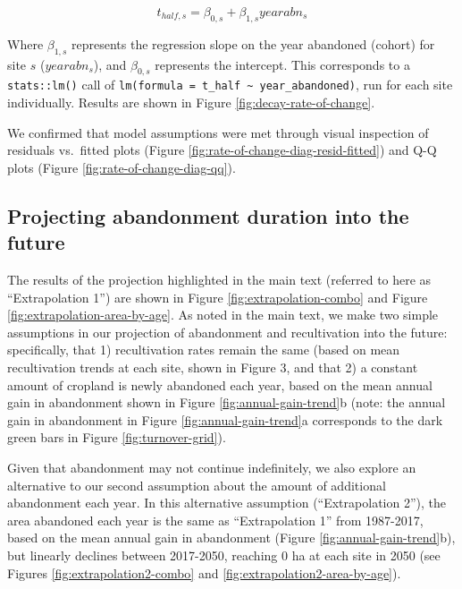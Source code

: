 \documentclass[9pt,twocolumn,twoside,lineno]{pnas-new}
\begin{document}
\begin{equation}
t_{half,s} = \beta_{0,s} + \beta_{1,s} yearabn_{s} \label{eq:rate-of-change-lm}
\end{equation}

Where \(\beta_{1,s}\) represents the regression slope on the year abandoned (cohort) for site \(s\) (\(yearabn_{s}\)), and \(\beta_{0,s}\) represents the intercept.
This corresponds to a \texttt{stats::lm()} call of \texttt{lm(formula\ =\ t\_half\ \textasciitilde{}\ year\_abandoned)}, run for each site individually.
Results are shown in Figure \ref{fig:decay-rate-of-change}.

We confirmed that model assumptions were met through visual inspection of residuals vs.~fitted plots (Figure \ref{fig:rate-of-change-diag-resid-fitted}) and Q-Q plots (Figure \ref{fig:rate-of-change-diag-qq}).

\hypertarget{section-extrapolation-si}{%
\subsection{Projecting abandonment duration into the future}\label{section-extrapolation-si}}

The results of the projection highlighted in the main text (referred to here as ``Extrapolation 1'') are shown in Figure \ref{fig:extrapolation-combo} and Figure \ref{fig:extrapolation-area-by-age}.
As noted in the main text, we make two simple assumptions in our projection of abandonment and recultivation into the future: specifically, that 1) recultivation rates remain the same (based on mean recultivation trends at each site, shown in Figure 3, and that 2) a constant amount of cropland is newly abandoned each year, based on the mean annual gain in abandonment shown in Figure \ref{fig:annual-gain-trend}b (note: the annual gain in abandonment in Figure \ref{fig:annual-gain-trend}a corresponds to the dark green bars in Figure \ref{fig:turnover-grid}).

Given that abandonment may not continue indefinitely, we also explore an alternative to our second assumption about the amount of additional abandonment each year.
In this alternative assumption (``Extrapolation 2''), the area abandoned each year is the same as ``Extrapolation 1'' from 1987-2017, based on the mean annual gain in abandonment (Figure \ref{fig:annual-gain-trend}b), but linearly declines between 2017-2050, reaching 0 ha at each site in 2050 (see Figures \ref{fig:extrapolation2-combo} and \ref{fig:extrapolation2-area-by-age}).
\end{document}
